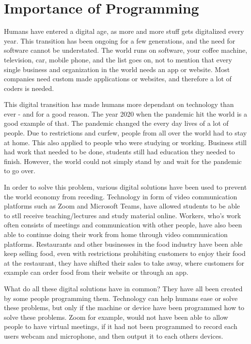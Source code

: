 \chapter{Importance of Programming} \label{chap:importance_of_programming}

Humans have entered a digital age, as more and more stuff gets 
digitalized every year. This transition has been ongoing for a few 
generations, and the need for software cannot be understated. The 
world runs on software, your coffee machine, television, car, mobile
phone, and the list goes on, not to mention that every single business 
and organization in the world needs an app or website. Most companies
need custom made applications or websites, and therefore a lot of coders
is needed.

This digital transition has made humans more dependant on technology than ever - 
and for a good reason. The year 2020 when the pandemic hit the world is a good example of that.
The pandemic changed the every day lives of a lot of people. Due to restrictions and curfew,
people from all over the world had to stay at home. This also applied to people 
who were studying or working. Business still had work that needed to be done,
students still had education they needed to finish. However, the world could not simply 
stand by and wait for the pandemic to go over. 

In order to solve this problem,
various digital solutions have been used to prevent the world economy from receding. 
Technology in form of video communication platforms such as Zoom and Microsoft Teams,
have allowed students to be able to stll receive teaching/lectures and study material online. 
Workers, who's work often consists of meetings and communication with other people,
have also been able to continue doing their work from home through video communication platforms. 
Restaurants and other businesses in the food industry have been able keep selling food, 
even with restrictions prohibiting customers to enjoy their food at the restaurant, 
they have shifted their sales to take away, where customers for example can order
food from their website or through an app.


What do all these digital solutions have in common? They have all been created by 
some people programming them. Technology can help humans ease or solve these problems, 
but only if the machine or device have been programmed how to solve these problems. 
Zoom for example, would not have been able to allow people to have virtual meetings, 
if it had not been programmed to record each users webcam and microphone, and then output
it to each others devices. 

